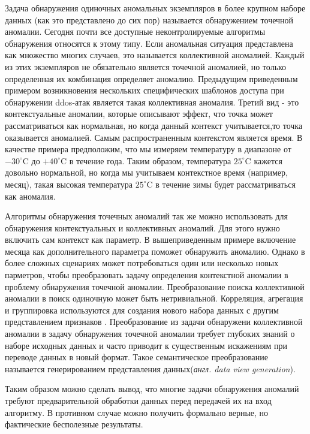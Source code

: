 Задача обнаружения одиночных аномальных экземпляров в более крупном наборе данных (как это представлено до сих пор) называется обнаружением точечной аномалии\cite{Book04}. Сегодня почти все доступные неконтролируемые алгоритмы обнаружения  относятся к этому типу. Если аномальная ситуация представлена ​​как множество многих случаев, это называется коллективной аномалией. Каждый из этих экземпляров не обязательно является точечной аномалией, но только определенная их комбинация определяет аномалию. Предыдущим приведенным примером возникновения нескольких специфических шаблонов доступа при обнаружении ddos-атак является такая коллективная аномалия. Третий вид - это контекстуальные аномалии, которые описывают эффект, что точка может рассматриваться как нормальная, но когда данный контекст учитывается,то точка оказывается аномалией. Самым распространенным контекстом является время. В качестве примера предположим, что мы измеряем температуру в диапазоне от $-30^{\circ}$C до $+40^{\circ}$C в течение года. Таким образом, температура $25^{\circ}$C кажется довольно нормальной, но когда мы учитываем контекстное время (например, месяц), такая высокая температура $25^{\circ}$C  в течение зимы  будет рассматриваться как аномалия.

Алгоритмы обнаружения точечных аномалий так же можно использовать для обнаружения контекстуальных и коллективных аномалий. Для этого нужно включить сам контекст как параметр. В вышеприведенным примере включение месяца как дополнительного параметра поможет обнаружить аномалию. Однако в более сложных сценариях может потребоваться один или несколько новых парметров, чтобы преобразовать задачу определения контекстной аномалии в проблему обнаружения точечной аномалии. Преобразование поиска коллективной аномалии в поиск одиночную может быть нетривиальной. Корреляция, агрегация и группировка используются  для создания нового набора данных с другим представлением признаков\cite{Book05} . Преобразование из задачи обнаружени коллективной аномалии в задачу обнаружения точечной аномалии требует глубоких знаний о наборе исходных данных и часто приводит  к существенным искажениям при переводе данных в новый формат. Такое семантическое преобразование называется  генерированием представления данных(\textit{англ. data view generation}).
  
  Таким образом можно сделать вывод, что многие задачи обнаружения аномалий требуют предварительной обработки данных перед передачей их на вход алгоритму. В противном случае можно получить формально верные, но фактические бесполезные результаты.

